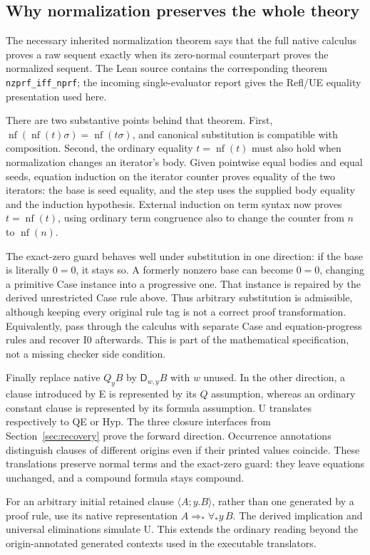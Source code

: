 \documentclass[11pt]{article}
\theoremstyle{definition}
\newcommand{\nf}{\mathop{\mathrm{nf}}}
\newcommand{\D}{\mathsf D}
\newcommand{\cl}[2]{\langle #1;#2\rangle}
\DeclareRobustCommand{\file}[1]{\nolinkurl{#1}}
\begin{document}
\subsection{Why normalization preserves the whole theory}

The necessary inherited normalization theorem says that the full native
calculus proves a raw sequent exactly when its zero-normal counterpart
proves the normalized sequent. The Lean source contains the corresponding
theorem \file{nzprf_iff_nprf}; the incoming single-evaluator report gives
the Refl/UE equality presentation used here.

There are two substantive points behind that theorem. First,
$\nf(\nf(t)\sigma)=\nf(t\sigma)$, and canonical substitution is compatible
with composition. Second, the ordinary equality $t=\nf(t)$ must also hold
when normalization changes an iterator's body. Given pointwise equal
bodies and equal seeds, equation induction on the iterator counter proves
equality of the two iterators: the base is seed equality, and the step uses
the supplied body equality and the induction hypothesis. External
induction on term syntax now proves $t=\nf(t)$, using ordinary term
congruence also to change the counter from $n$ to $\nf(n)$.

The exact-zero guard behaves well under substitution in one direction:
if the base is literally $0=0$, it stays so. A formerly nonzero base can
become $0=0$, changing a primitive Case instance into a progressive one.
That instance is repaired by the derived unrestricted Case rule above.
Thus arbitrary substitution is admissible, although keeping every original
rule tag is not a correct proof transformation. Equivalently, pass through
the calculus with separate Case and equation-progress rules and recover I0
afterwards. This is part of the mathematical specification, not a missing
checker side condition.

Finally replace native $Q_yB$ by $\D_{w,y}B$ with $w$ unused. In the other
direction, a clause introduced by E is represented by its $Q$ assumption,
whereas an ordinary constant clause is represented by its formula
assumption. U translates respectively to QE or Hyp. The three closure
interfaces from Section~\ref{sec:recovery} prove the forward direction.
Occurrence annotations distinguish clauses of different origins even if
their printed values coincide. These translations preserve normal terms
and the exact-zero guard: they leave equations unchanged, and a compound
formula stays compound.

For an arbitrary initial retained clause $\cl{A}{y.B}$, rather than one
generated by a proof rule, use its native representation
$A\Rightarrow_*\forall_*y\,B$. The derived implication and universal
eliminations simulate U. This extends the ordinary reading beyond the
origin-annotated generated contexts used in the executable translators.
\end{document}

